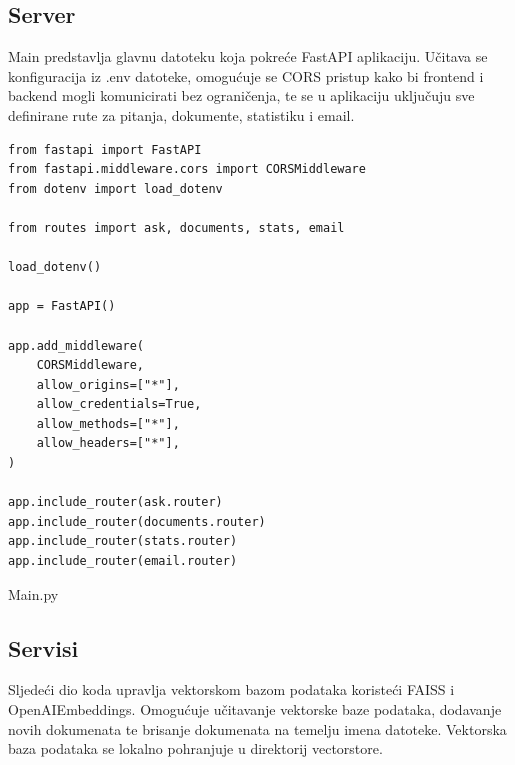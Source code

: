 \documentclass[]{foi}
\begin{document}
\subsection{Server}
Main predstavlja glavnu datoteku koja pokreće FastAPI aplikaciju. Učitava se konfiguracija iz .env datoteke, omogućuje se CORS pristup
kako bi frontend i backend mogli komunicirati bez ograničenja, te se u aplikaciju uključuju sve definirane rute za pitanja, dokumente, statistiku
i email. 

\begin{longlisting}
\begin{verbatim}
from fastapi import FastAPI
from fastapi.middleware.cors import CORSMiddleware
from dotenv import load_dotenv

from routes import ask, documents, stats, email

load_dotenv()

app = FastAPI()

app.add_middleware(
    CORSMiddleware,
    allow_origins=["*"],
    allow_credentials=True,
    allow_methods=["*"],
    allow_headers=["*"],
)

app.include_router(ask.router)
app.include_router(documents.router)
app.include_router(stats.router)
app.include_router(email.router)

\end{verbatim}
\caption{Main.py}
\label{lst:main}
\end{longlisting}


\subsection{Servisi}

Sljedeći dio koda upravlja vektorskom bazom podataka koristeći FAISS i OpenAIEmbeddings. Omogućuje učitavanje vektorske baze podataka, dodavanje
novih dokumenata te brisanje dokumenata na temelju imena datoteke. Vektorska baza podataka se lokalno pohranjuje u direktorij vectorstore.
\end{document}
